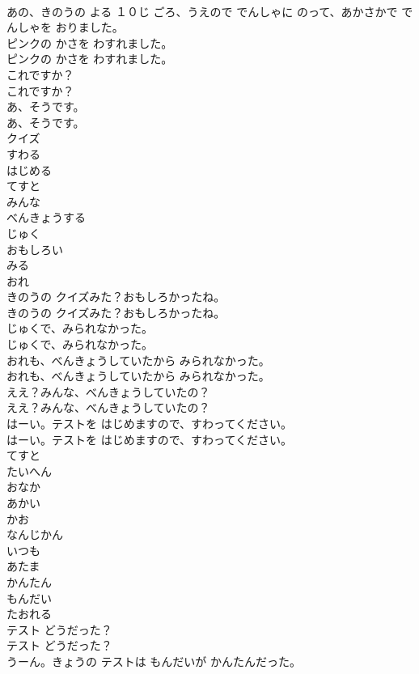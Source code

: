 \documentclass[8pt]{extreport}
\begin{document}
\begin{CJK}{UTF8}{min}
\\	あの、きのうの よる １０じ ごろ、うえので でんしゃに のって、あかさかで でんしゃを おりました。
\\	ピンクの かさを わすれました。
\\	ピンクの かさを わすれました。
\\	これですか？
\\	これですか？
\\	あ、そうです。
\\	あ、そうです。
\\	クイズ
\\	すわる
\\	はじめる
\\	てすと
\\	みんな
\\	べんきょうする
\\	じゅく
\\	おもしろい
\\	みる
\\	おれ
\\	きのうの クイズみた？おもしろかったね。
\\	きのうの クイズみた？おもしろかったね。
\\	じゅくで、みられなかった。
\\	じゅくで、みられなかった。
\\	おれも、べんきょうしていたから みられなかった。
\\	おれも、べんきょうしていたから みられなかった。
\\	ええ？みんな、べんきょうしていたの？
\\	ええ？みんな、べんきょうしていたの？
\\	はーい。テストを はじめますので、すわってください。
\\	はーい。テストを はじめますので、すわってください。
\\	てすと
\\	たいへん
\\	おなか
\\	あかい
\\	かお
\\	なんじかん
\\	いつも
\\	あたま
\\	かんたん
\\	もんだい
\\	たおれる
\\	テスト どうだった？
\\	テスト どうだった？
\\	うーん。きょうの テストは もんだいが かんたんだった。

\end{CJK}
\end{document}

